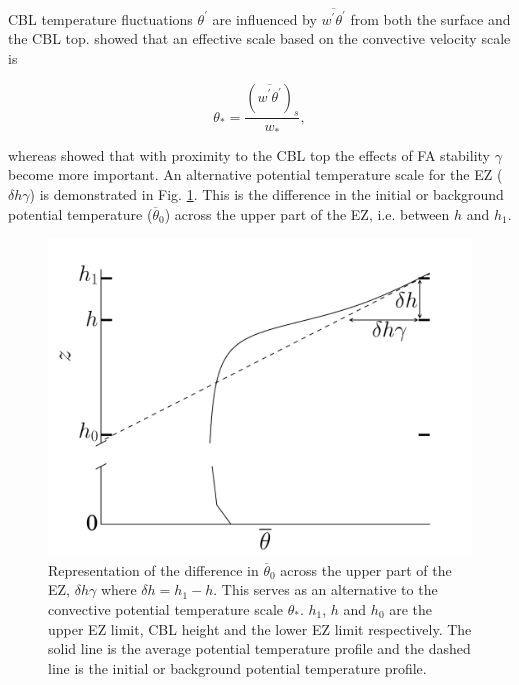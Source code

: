 CBL temperature fluctuations $\theta^{'}$ are influenced by $\overline{w^{'}\theta^{'}}$ from both the surface and the CBL top.
\cite{Deardorff70} showed that an effective scale based on the convective velocity scale is

\begin{equation}
\theta_{*} = \frac{(\overline{w^{'}\theta^{'}})_{s}}{w_{*}},
\end{equation} 

whereas \cite{Sorbjan1} showed that with proximity to the CBL top the effects of FA stability $\gamma$ become more important.  An alternative potential temperature scale for the EZ ($\delta h \gamma$) is demonstrated in Fig. \ref{fig:deltahgamma}. This is the difference in the initial or background potential temperature ($\overline{\theta}_{0}$) across the upper part of the EZ, i.e. between $h$ and $h_{1}$.      

\begin{figure}[htbp]
    \centering
    \includegraphics[scale=.32]{figures/deltah_gamma.pdf}
    \caption[Alternative Potential Temperature Scale for the EZ]{Representation of the difference in $\overline{\theta}_{0}$ across the upper part of the EZ, $\delta h \gamma$ where $\delta h = h_{1} - h$. This serves as an alternative to the convective potential temperature scale $\theta_{*}$. $h_{1}$, $h$ and $h_{0}$ are the upper EZ limit, CBL height and the lower EZ limit respectively. The solid line is the average potential temperature profile and the dashed line is the initial or background potential temperature profile.}
    \label{fig:deltahgamma}   %
\end{figure}

